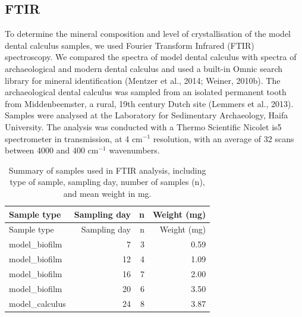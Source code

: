 \documentclass[
]{article}
\begin{document}
\hypertarget{ftir}{%
\subsection{FTIR}\label{ftir}}

To determine the mineral composition and level of crystallisation of the
model dental calculus samples, we used Fourier Transform Infrared (FTIR)
spectroscopy. We compared the spectra of model dental calculus with
spectra of archaeological and modern dental calculus and used a built-in
Omnic search library for mineral identification (Mentzer et al., 2014;
Weiner, 2010b). The archaeological dental calculus was sampled from an
isolated permanent tooth from Middenbeemster, a rural, 19th century
Dutch site (Lemmers et al., 2013). Samples were analysed at the
Laboratory for Sedimentary Archaeology, Haifa University. The analysis
was conducted with a Thermo Scientific Nicolet is5 spectrometer in
transmission, at 4 cm\(^{-1}\) resolution, with an average of 32 scans
between 4000 and 400 cm\(^{-1}\) wavenumbers.

\hypertarget{tbl-ftir-byoc}{}
\begin{longtable}[]{@{}lrrr@{}}
\caption{\label{tbl-ftir-byoc}Summary of samples used in FTIR analysis,
including type of sample, sampling day, number of samples (n), and mean
weight in mg.}\tabularnewline
\toprule\noalign{}
Sample type & Sampling day & n & Weight (mg) \\
\midrule\noalign{}
\endfirsthead
\toprule\noalign{}
Sample type & Sampling day & n & Weight (mg) \\
\midrule\noalign{}
\endhead
\bottomrule\noalign{}
\endlastfoot
model\_biofilm & 7 & 3 & 0.59 \\
model\_biofilm & 12 & 4 & 1.09 \\
model\_biofilm & 16 & 7 & 2.00 \\
model\_biofilm & 20 & 6 & 3.50 \\
model\_calculus & 24 & 8 & 3.87 \\
\end{longtable}
\end{document}

